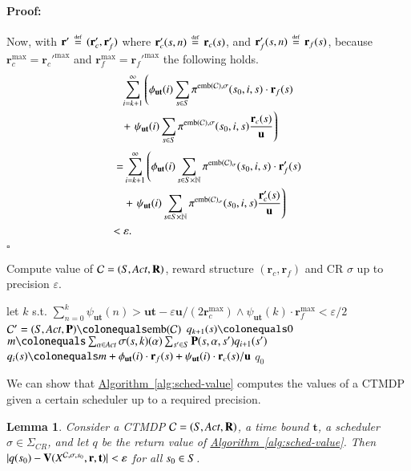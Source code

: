 \documentclass[10pt,twocolumn]{article}
\newenvironment{proof}{\paragraph{Proof:}}{\hfill$\square$}
\newtheorem{lemma}{Lemma}
\renewcommand{\gets}{\colonequals}
\newcommand{\states} {{\ensuremath S}}
\newcommand{\state}  {{\ensuremath s}}
\newcommand{\nats}    {{\ensuremath {\mathbb{N}}}}
\newcommand{\sched}  {{\ensuremath {\sigma}}}
\newcommand{\acts}{\mathit{Act}}
\newcommand{\pmat}{\mathbf{P}}
\newcommand{\rmat}{\mathbf{R}}
\newcommand{\cmodel}{\mathcal{C}}
\newcommand{\urate}{\mathbf{u}}
\newcommand{\act}{\alpha}
\newcommand{\schedscr}{\Sigma_\mathit{CR}}
\newcommand{\rew}{\mathbf{r}}
\newcommand{\frew}{\mathbf{r}_f}
\newcommand{\crew}{\mathbf{r}_c}
\newcommand{\timeb}{\mathbf{t}}
\newcommand{\mvalue}{\mathbf{V}}
\newcommand{\precision}{\varepsilon}
\newcommand{\emb}{\mathrm{emb}}
\newcommand{\stopro}{X}
\newcommand{\refalg}[1]{\texorpdfstring{\hyperref[alg:#1]{Algorithm~\ref*{alg:#1}}}{Algorithm~\ref*{alg:#1}}}
\newcommand{\defeq}{\,\stackrel{\mbox{\rm {\tiny def}}}{=}\,}
\newcommand{\tprob}{\pi}
\begin{document}
\begin{proof}
Now, with $\rew' \defeq (\crew', \frew')$ where $\crew'(\state, n) \defeq \crew(\state)$, and $\frew'(\state, n) \defeq \frew(\state)$,
because $\crew^{\max} = \crew'^{\max}$ and $\frew^{\max} = \frew'^{\max}$ the following holds.
\begin{equation*}
\begin{split}
  & \sum_{i=k+1}^\infty \left(\phi_{\urate \timeb}(i) \sum_{\state \in \states} \tprob^{\emb(\cmodel),\sched}(\state_0,
  i, \state) \cdot \frew(\state)\right. \\
  & + \left.\psi_{\urate \timeb}(i) \sum_{\state \in \states} \tprob^{\emb(\cmodel),\sched}(\state_0, i, \state)
    \frac{\crew(\state)}{\urate}\right) \end{split}
\end{equation*}
\begin{equation*}
\begin{split}
  = & \sum_{i=k+1}^\infty \left(\phi_{\urate \timeb}(i) \sum_{\state \in \states \times \nats} \tprob^{\emb(\cmodel)_\sched}(\state_0,
  i, \state) \cdot \frew'(\state)\right. \\
  & + \left.\psi_{\urate \timeb}(i) \sum_{\state \in \states \times \nats} \tprob^{\emb(\cmodel)_\sched}(\state_0, i, \state)
    \frac{\crew'(\state)}{\urate}\right) \\
  < {} & \precision .
\end{split}
\end{equation*}
\end{proof}

\begin{algorithm}
  \caption{\label{alg:sched-value} Compute value of $\cmodel = (\states, \acts, \rmat)$, reward structure $(\crew, \frew)$ and CR $\sched$ up to precision $\precision$.}
  \DontPrintSemicolon
  let $k$ s.t. $\sum_{n=0}^k\psi_{\urate \timeb}(n) > \urate \timeb -
  \precision \urate/(2\crew^{\max})
  \wedge \psi_{\urate \timeb}(k) \cdot \frew^{\max} <
  \precision/2 $\;
  $\cmodel' = (\states, \acts, \pmat) \gets \emb(\cmodel)$ \;
  \lForAll{$\state \in \states$} {$q_{k+1}(\state) \gets 0$ \;
  }
   {
    \ForAll{$\state \in \states$} {
      $m \gets \sum_{\act \in \acts} \sched(\state,k)(\act) \sum_{\state' \in S} \pmat(s,\act,s')
      q_{i+1}(s')$ \;
      $q_i(\state) \gets m + \phi_{\urate \timeb}(i) \cdot \frew(\state) +
      \psi_{\urate \timeb}(i) \cdot \crew(\state)/\urate$ \;
    }
  }
  \Return $q_0$
\end{algorithm}

We can show that \refalg{sched-value} computes the values of a CTMDP given a certain scheduler up to a required precision.
\begin{lemma}
\label{lem:sched-value-prec}
Consider a CTMDP $\cmodel = (\states, \acts, \rmat)$, a time bound $\timeb$, a scheduler $\sched \in \schedscr$, and let $q$ be the return value of \refalg{sched-value}.
Then $|q(\state_0) - \mvalue(\stopro^{\cmodel,\sched,\state_0}, \rew, \timeb) | < \precision$ for all $\state_0 \in \states$.
\end{lemma}
\end{document}
